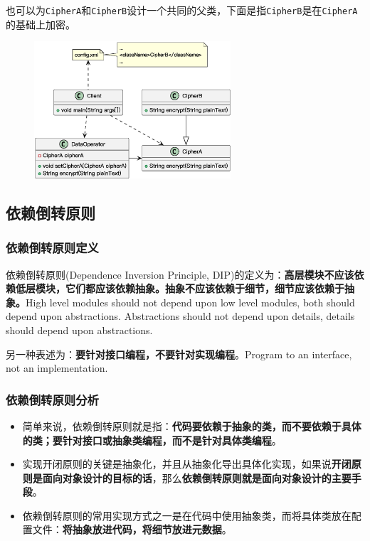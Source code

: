 也可以为\;\verb|CipherA|\;和\;\verb|CipherB|\;设计一个共同的父类，下面是指\;\verb|CipherB|\;是在\;\verb|CipherA|\;的基础上加密。
\begin{figure}[H]
    \vspace{-0.5em}
	\centering
	\includegraphics[width=0.65\textwidth]{images/里氏代换原则实例2.eps}
    \vspace{-1em}
\end{figure}

\subsection{依赖倒转原则}

\subsubsection{依赖倒转原则定义}
依赖倒转原则(Dependence Inversion Principle, DIP)的定义为：\textbf{高层模块不应该依赖低层模块，它们都应该依赖抽象。抽象不应该依赖于细节，细节应该依赖于抽象。}High level modules should not depend upon low level modules, both should depend upon abstractions. Abstractions should not depend upon details, details should depend upon abstractions.

另一种表述为：\textbf{要针对接口编程，不要针对实现编程}。Program to an interface, not an implementation.

\subsubsection{依赖倒转原则分析}
\begin{itemize}
    \item 简单来说，依赖倒转原则就是指：\textbf{代码要依赖于抽象的类，而不要依赖于具体的类；要针对接口或抽象类编程，而不是针对具体类编程}。
    \item 实现开闭原则的关键是抽象化，并且从抽象化导出具体化实现，如果说\textbf{开闭原则是面向对象设计的目标的话}，那么\textbf{依赖倒转原则就是面向对象设计的主要手段}。
    \item 依赖倒转原则的常用实现方式之一是在代码中使用抽象类，而将具体类放在配置文件：\textbf{将抽象放进代码，将细节放进元数据}。
\end{itemize}

